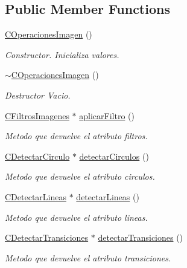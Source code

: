 \subsection*{Public Member Functions}
\begin{DoxyCompactItemize}
\item 
\hyperlink{classCOperacionesImagen_ae79f327bbdfdf61e555b78f68351afa4}{C\+Operaciones\+Imagen} ()
\begin{DoxyCompactList}\small\item\em Constructor. Inicializa valores. \end{DoxyCompactList}\item 
\hyperlink{classCOperacionesImagen_a876e87d4477e3547b82d24ddea188f7b}{$\sim$\+C\+Operaciones\+Imagen} ()
\begin{DoxyCompactList}\small\item\em Destructor Vacio. \end{DoxyCompactList}\item 
\hyperlink{classCFiltrosImagenes}{C\+Filtros\+Imagenes} $\ast$ \hyperlink{classCOperacionesImagen_a4a2bc277c960648dc2a88aa49e6a4d28}{aplicar\+Filtro} ()
\begin{DoxyCompactList}\small\item\em Metodo que devuelve el atributo filtros. \end{DoxyCompactList}\item 
\hyperlink{classCDetectarCirculo}{C\+Detectar\+Circulo} $\ast$ \hyperlink{classCOperacionesImagen_a8284a380dae8383e63c85fcc9b4aff04}{detectar\+Circulos} ()
\begin{DoxyCompactList}\small\item\em Metodo que devuelve el atributo circulos. \end{DoxyCompactList}\item 
\hyperlink{classCDetectarLineas}{C\+Detectar\+Lineas} $\ast$ \hyperlink{classCOperacionesImagen_a0dbb1c8970ca701b6af7bb45dc2a912a}{detectar\+Lineas} ()
\begin{DoxyCompactList}\small\item\em Metodo que devuelve el atributo lineas. \end{DoxyCompactList}\item 
\hyperlink{classCDetectarTransiciones}{C\+Detectar\+Transiciones} $\ast$ \hyperlink{classCOperacionesImagen_a9e025ecb29931b9e472e2989b4ee50a2}{detectar\+Transiciones} ()
\begin{DoxyCompactList}\small\item\em Metodo que devuelve el atributo transiciones. \end{DoxyCompactList}\item 

\end{DoxyCompactItemize}
